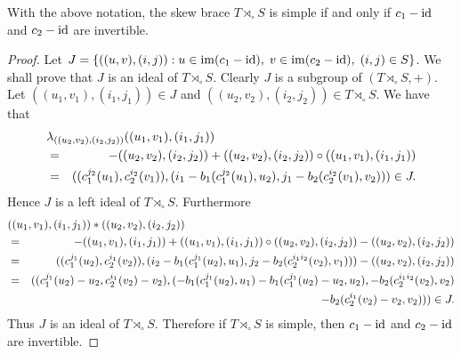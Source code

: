 \begin{theorem}\label{thm:simplebrace}
	With the above notation, the skew brace $T\rtimes_{\circ}S$ is simple if and only if $c_1-\operatorname{id}$ and $c_2-\operatorname{id}$ are invertible. 
\end{theorem}  

\begin{proof}
	Let $J=\{((u,v),(i,j)) : u\in\operatorname{im}(c_1-\operatorname{id}),\; v\in \operatorname{im}(c_2-\operatorname{id}), \; (i,j)\in S\}$. We shall prove that $J$ is an ideal of $T\rtimes_{\circ}S$. Clearly $J$ is a subgroup of $(T\rtimes_{\circ}S, +)$. Let $((u_1,v_1),(i_1,j_1))\in J$ and $((u_2,v_2),(i_2,j_2))\in T\rtimes_{\circ}S$. We have that
	\begin{eqnarray*}
		\lefteqn{\lambda_{((u_2,v_2),(i_2,j_2))}((u_1,v_1),(i_1,j_1))}\\
		&=&-((u_2,v_2),(i_2,j_2))+((u_2,v_2),(i_2,j_2))\circ ((u_1,v_1),(i_1,j_1))\\
		&=&((c_1^{j_2}(u_1),c_2^{i_2}(v_1)),(i_1-b_1(c_1^{j_2}(u_1),u_2),j_1-b_2(c_2^{i_2}(v_1),v_2)))\in J.
	\end{eqnarray*}
Hence $J$ is a left ideal of $T\rtimes_{\circ}S$. Furthermore
\begin{eqnarray*}
	\lefteqn{((u_1,v_1),(i_1,j_1))*((u_2,v_2),(i_2,j_2))}\\
	&=&-((u_1,v_1),(i_1,j_1))+((u_1,v_1),(i_1,j_1))\circ ((u_2,v_2),(i_2,j_2))-((u_2,v_2),(i_2,j_2))\\
	&=&((c_1^{j_1}(u_2),c_2^{i_1}(v_2)),(i_2-b_1(c_1^{j_1}(u_2),u_1),j_2-b_2(c_2^{i_1i_2}(v_2),v_1)))-((u_2,v_2),(i_2,j_2))\\
	&=&((c_1^{j_1}(u_2)-u_2,c_2^{i_1}(v_2)-v_2),(-b_1(c_1^{j_1}(u_2),u_1)-b_1(c_1^{j_1}(u_2)-u_2,u_2),-b_2(c_2^{i_1i_2}(v_2),v_2)\\
	&&\qquad\qquad -b_2(c_2^{i_1}(v_2)-v_2,v_2)))\in J.
\end{eqnarray*}	
Thus $J$ is an ideal of $T\rtimes_{\circ}S$. Therefore if $T\rtimes_{\circ}S$ is simple, then $c_1-\operatorname{id}$ and $c_2-\operatorname{id}$ are invertible.


\end{proof}
